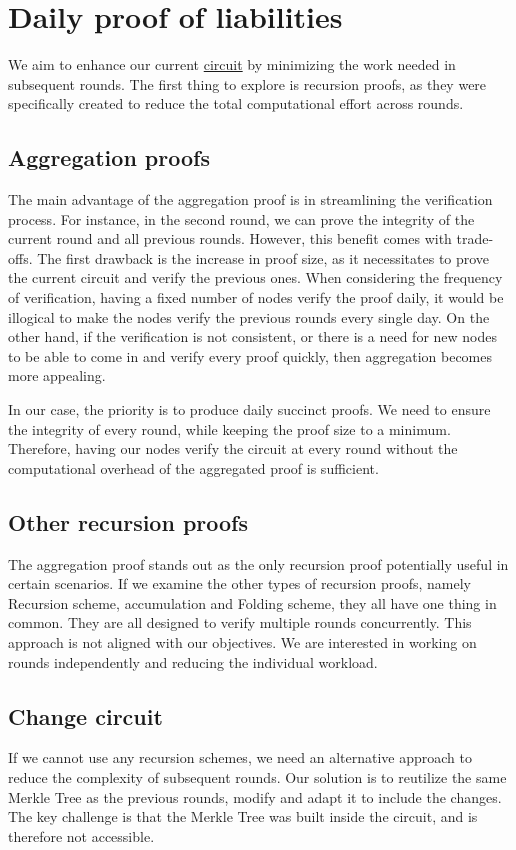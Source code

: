 \section{Daily proof of liabilities}
We aim to enhance our current \hyperref[subsec:pl]{circuit} by minimizing the work needed in subsequent rounds.
The first thing to explore is recursion proofs, as they were specifically created to reduce the total computational effort across rounds.

\subsection{Aggregation proofs}
The main advantage of the aggregation proof is in streamlining the verification process. For instance, in the second round, we can prove the integrity of the current round and all previous rounds.
However, this benefit comes with trade-offs. The first drawback is the increase in proof size, as it necessitates to prove the current circuit and verify the previous ones.
When considering the frequency of verification, having a fixed number of nodes verify the proof daily, it would be illogical to make the nodes verify the previous rounds every single day.
On the other hand, if the verification is not consistent, or there is a need for new nodes to be able to come in and verify every proof quickly, then aggregation becomes more appealing.

In our case, the priority is to produce daily succinct proofs. We need to ensure the integrity of every round, while keeping the proof size to a minimum.
Therefore, having our nodes verify the circuit at every round without the computational overhead of the aggregated proof is sufficient.

\subsection{Other recursion proofs}
The aggregation proof stands out as the only recursion proof potentially useful in certain scenarios.
If we examine the other types of recursion proofs, namely Recursion scheme, accumulation and Folding scheme, they all have one thing in common.
They are all designed to verify multiple rounds concurrently.
This approach is not aligned with our objectives. We are interested in working on rounds independently and reducing the individual workload.

\subsection{Change circuit}
If we cannot use any recursion schemes, we need an alternative approach to reduce the complexity of subsequent rounds.
Our solution is to reutilize the same Merkle Tree as the previous rounds, modify  and adapt it to include the changes.
The key challenge is that the Merkle Tree was built inside the circuit, and is therefore not accessible.


